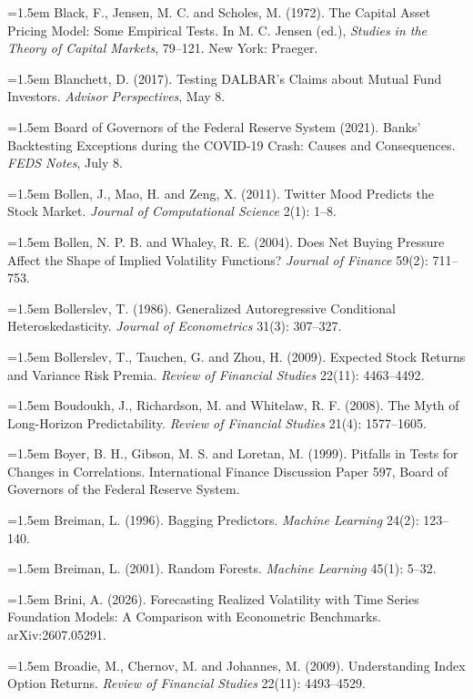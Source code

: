 \hangindent=1.5em Black, F., Jensen, M. C. and Scholes, M. (1972). The Capital Asset Pricing Model: Some Empirical Tests. In M. C. Jensen (ed.), \emph{Studies in the Theory of Capital Markets}, 79--121. New York: Praeger.

\hangindent=1.5em Blanchett, D. (2017). Testing DALBAR's Claims about Mutual Fund Investors. \emph{Advisor Perspectives}, May 8.

\hangindent=1.5em Board of Governors of the Federal Reserve System (2021). Banks' Backtesting Exceptions during the COVID-19 Crash: Causes and Consequences. \emph{FEDS Notes}, July 8.

\hangindent=1.5em Bollen, J., Mao, H. and Zeng, X. (2011). Twitter Mood Predicts the Stock Market. \emph{Journal of Computational Science} 2(1): 1--8.

\hangindent=1.5em Bollen, N. P. B. and Whaley, R. E. (2004). Does Net Buying Pressure Affect the Shape of Implied Volatility Functions? \emph{Journal of Finance} 59(2): 711--753.

\hangindent=1.5em Bollerslev, T. (1986). Generalized Autoregressive Conditional Heteroskedasticity. \emph{Journal of Econometrics} 31(3): 307--327.

\hangindent=1.5em Bollerslev, T., Tauchen, G. and Zhou, H. (2009). Expected Stock Returns and Variance Risk Premia. \emph{Review of Financial Studies} 22(11): 4463--4492.

\hangindent=1.5em Boudoukh, J., Richardson, M. and Whitelaw, R. F. (2008). The Myth of Long-Horizon Predictability. \emph{Review of Financial Studies} 21(4): 1577--1605.

\hangindent=1.5em Boyer, B. H., Gibson, M. S. and Loretan, M. (1999). Pitfalls in Tests for Changes in Correlations. International Finance Discussion Paper 597, Board of Governors of the Federal Reserve System.

\hangindent=1.5em Breiman, L. (1996). Bagging Predictors. \emph{Machine Learning} 24(2): 123--140.

\hangindent=1.5em Breiman, L. (2001). Random Forests. \emph{Machine Learning} 45(1): 5--32.

\hangindent=1.5em Brini, A. (2026). Forecasting Realized Volatility with Time Series Foundation Models: A Comparison with Econometric Benchmarks. arXiv:2607.05291.

\hangindent=1.5em Broadie, M., Chernov, M. and Johannes, M. (2009). Understanding Index Option Returns. \emph{Review of Financial Studies} 22(11): 4493--4529.

